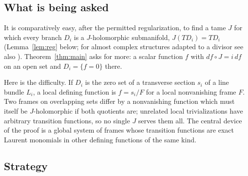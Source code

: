 \documentclass[11pt]{article}
\theoremstyle{remark}
\begin{document}
\subsection*{What is being asked}

It is comparatively easy, after the permitted regularization, to find
a tame $J$ for which every branch $D_i$ is a $J$-holomorphic
submanifold, $J(TD_i)=TD_i$ (Lemma~\ref{lem:reg} below; for almost
complex structures adapted to a divisor see also \cite[Section 3]{FZ}).
Theorem~\ref{thm:main} asks for more: a scalar function $f$ with
$df\circ J=i\,df$ on an open set and $D_i=\{f=0\}$ there.

Here is the difficulty. If $D_i$ is the zero set of a transverse
section $s_i$ of a line bundle $L_i$, a local defining function is
$f=s_i/F$ for a local nonvanishing frame $F$. Two frames on
overlapping sets differ by a nonvanishing function which must itself be
$J$-holomorphic if both quotients are; unrelated local trivializations
have arbitrary transition functions, so no single $J$ serves them all.
The central device of the proof is a global system of frames whose
transition functions are exact Laurent monomials in other defining
functions of the same kind.

\subsection*{Strategy}
\end{document}
